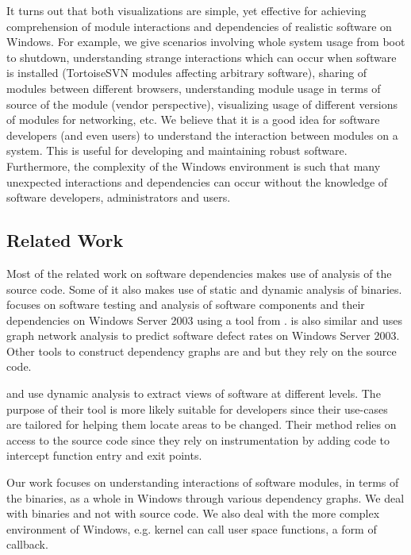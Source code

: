 It turns out that both visualizations are simple, yet effective for
achieving comprehension of module interactions and dependencies
of realistic software on Windows. For example, we give scenarios
involving whole system usage from boot to shutdown, understanding strange
interactions which can occur when software is installed (TortoiseSVN modules
affecting arbitrary software), sharing of modules between different browsers,
understanding module usage in terms of source of the module
(vendor perspective),
visualizing usage of different versions of modules for networking, etc.
We believe that it is a good idea for software developers (and even users)
to understand the interaction between modules on a system.
This is useful for developing and maintaining
robust software. Furthermore, the complexity of the
Windows environment is such that many unexpected interactions
and dependencies can occur without the knowledge of software developers,
administrators and users.

\subsection{Related Work}

Most of the related work on software dependencies makes use of analysis
of the source code. Some of it also makes use of static and
dynamic analysis of binaries.
\cite{nagappan2007using} focuses on software testing and analysis of
software components and their dependencies on Windows Server 2003
using a tool from \cite{srivastava2005efficient}.
\cite{zimmermann2008predicting} is also similar and uses graph network analysis
to predict software defect rates on Windows Server 2003.
Other tools to construct dependency graphs are \cite{wilde1989dependency} and \cite{wilhelm2005dependency}
but they rely on the source code.

\cite{salah2004hierarchy} and \cite{salah2006scenario} use dynamic analysis to extract
views of software at different levels. The purpose of their tool is more likely
suitable for developers since their use-cases are tailored for helping
them locate areas to be changed. Their method relies on access to the source
code since they rely on instrumentation by adding code to intercept function
entry and exit points.

Our work focuses on understanding interactions of software modules,
in terms of the binaries, as a whole in Windows through
various dependency graphs. We deal with binaries and not with source code.
We also deal with the more complex environment of Windows, e.g. kernel
can call user space functions, a form of callback.


